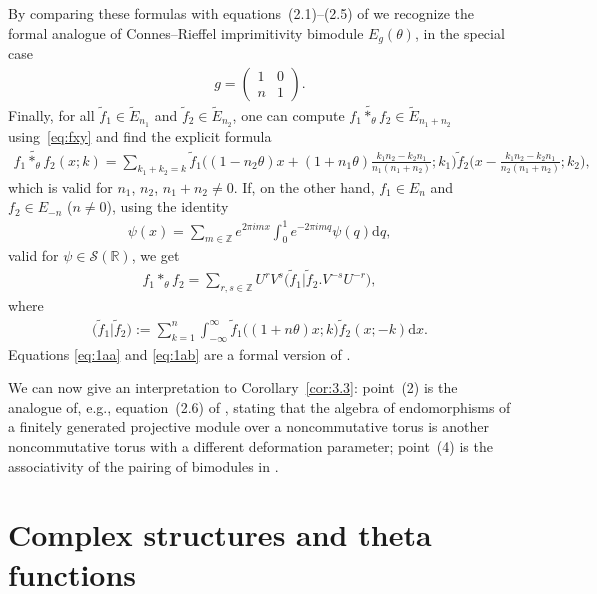 \documentclass[10pt,a4paper]{amsart}
\numberwithin{equation}{section}
\theoremstyle{definition}
\newcommand{\R}{\mathbb{R}}
\newcommand{\Z}{\mathbb{Z}}
\newcommand{\mc}{\mathcal}
\newcommand{\de}{\mathrm{d}}
\begin{document}
By comparing these formulas with equations~(2.1)--(2.5) of \cite{Pla06} we recognize the formal analogue of Connes--Rief\/fel imprimitivity bimodule $E_g(\theta)$, in the special case
\begin{gather}\label{eq:gn}
g= \begin{pmatrix} 1 & 0 \\ n & 1 \end{pmatrix} .
\end{gather}
Finally, for all $\widetilde f_1\in \widetilde E_{n_1}$ and $\widetilde f_2\in\widetilde E_{n_2}$,
one can compute $\widetilde{f_1\ast_\theta f_2}\in\widetilde E_{n_1+n_2}$
using~\eqref{eq:fxy} and f\/ind the explicit formula
\begin{gather}\label{eq:1aa}
\widetilde{f_1\ast_\theta f_2}(x;k)=\sum_{k_1+k_2=k}\!\widetilde{f}_1\big((1-n_2\theta)x+(1+n_1\theta)\tfrac{k_1n_2-k_2n_1}{n_1(n_1+n_2)}
;k_1\big)\widetilde{f}_2\big(x
-\tfrac{k_1n_2-k_2n_1}{n_2(n_1+n_2)};k_2\big) ,\!\!\!
\end{gather}
which is valid for $n_1$, $n_2$, $n_1+n_2\neq 0$. If, on the other hand, $f_1\in E_n$ and $f_2\in E_{-n}$ ($n\neq 0$), using the identity
\begin{gather*}
\psi(x)=\sum_{m\in\Z}e^{2\pi imx}\int_0^1
e^{-2\pi imq}\psi(q)\de q ,
\end{gather*}
valid for $\psi\in\mc{S}(\R)$,
we get
\begin{gather}\label{eq:1ab}
f_1\ast_\theta f_2=
\sum_{r,s\in\Z}U^rV^s \big(\widetilde f_1\big|\widetilde f_2.V^{-s}U^{-r}\big),
\end{gather}
where
\begin{gather*}
\big(\widetilde f_1\big|\widetilde f_2\big):=\sum_{k=1}^n\int_{-\infty}^{\infty}
\widetilde f_1\big((1+n\theta)x;k\big)\widetilde f_2(x;-k)\de x .
\end{gather*}
Equations \eqref{eq:1aa} and \eqref{eq:1ab} are a formal version of \cite[Proposition~1.2(a)]{PS02}.

We can now give an interpretation to Corollary~\ref{cor:3.3}: point~(2) is the analogue of, e.g., equation~(2.6) of \cite{Pla06}, stating that the algebra of endomorphisms of a f\/initely generated projective module over a noncommutative torus is another noncommutative torus with a dif\/ferent deformation parameter; point~(4) is the associativity of the pairing of bimodules in \cite[Proposition~1.2(b)]{PS02}.

\section{Complex structures and theta functions}\label{sec:5}
\end{document}
